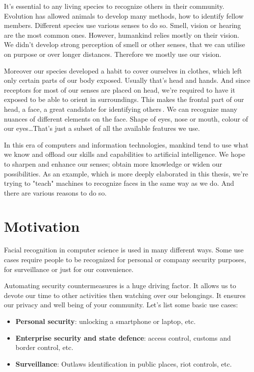 It's essential to any living species to recognize others in their community. Evolution has allowed animals to develop many methods, how to identify fellow members. Different species use various senses to do so. Smell, vision or hearing are the most common ones. However, humankind relies mostly on their vision. We didn't develop strong perception of smell or other senses, that we can utilise on purpose or over longer distances. Therefore we mostly use our vision.

Moreover our species developed a habit to cover ourselves in clothes, which left only certain parts of our body exposed. Usually that's head and hands. And since receptors for most of our senses are placed on head, we're required to have it exposed to be able to orient in surroundings. This makes the frontal part of our head, a face, a great candidate for identifying others\,\cite{biometrie1}. We can recognize many nuances of different elements on the face. Shape of eyes, nose or mouth, colour of our eyes\dots That's just a subset of all the available features we use.

In this era of computers and information technologies, mankind tend to use what we know and offload our skills and capabilities to artificial intelligence. We hope to sharpen and enhance our senses; obtain more knowledge or widen our possibilities. As an example, which is more deeply elaborated in this thesis, we're trying to "teach" machines to recognize faces in the same way as we do. And there are various reasons to do so.

\section{Motivation}
Facial recognition in computer science is used in many different ways. Some use cases require people to be recognized for personal or company security purposes, for surveillance or just for our convenience.

Automating security countermeasures is a huge driving factor. It allows us to devote our time to other activities then watching over our belongings. It ensures our privacy and well being of your community. Let's list some basic use cases:

\begin{itemize}
    \item \textbf{Personal security}: unlocking a smartphone or laptop, etc.
    \item \textbf{Enterprise security and state defence}: access control, customs and border control, etc.
    \item \textbf{Surveillance}: Outlaws identification in public places, riot controls, etc.
\end{itemize}

